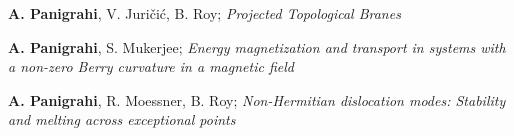 \begin{cventries}
{\begin{cvitems}
	  	\item{\textbf{A. Panigrahi}, V. Juri\v{c}i\'c, B. Roy; \textit{Projected Topological Branes}}
	  	\item{\textbf{A. Panigrahi}, S. Mukerjee; \textit{Energy magnetization and transport in systems with a non-zero Berry curvature in a magnetic field}
	  		}
      	\item{\textbf{A. Panigrahi}, R. Moessner, B. Roy; \textit{Non-Hermitian dislocation modes: Stability and melting across exceptional points} }
      \end{cvitems}
    }


\end{cventries}
